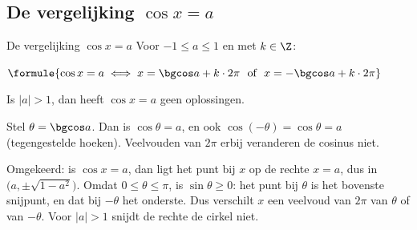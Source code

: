 \subsection{De vergelijking $\cos x = a$}


\begin{theorie}
\begin{stelling}{De vergelijking $\cos x = a$}
Voor $-1 \leqslant a \leqslant 1$ en met $k \in \Z$:

\vspace{1mm}
\qquad $\formule{\cos x = a \iff x = \bgcos a + k \cdot 2\pi \ \text{ of } \ x = -\bgcos a + k \cdot 2\pi}$

\vspace{1mm}
Is $|a| > 1$, dan heeft $\cos x = a$ geen oplossingen.
\end{stelling}
\begin{bewijs}
Stel $\theta = \bgcos a$. Dan is $\cos\theta = a$, en ook $\cos(-\theta) = \cos\theta = a$ (tegengestelde hoeken). Veelvouden van $2\pi$ erbij veranderen de cosinus niet.

Omgekeerd: is $\cos x = a$, dan ligt het punt bij $x$ op de rechte $x = a$, dus in $\bigl(a, \pm\sqrt{1 - a^2}\bigr)$. Omdat $0 \leqslant \theta \leqslant \pi$, is $\sin\theta \geqslant 0$: het punt bij $\theta$ is het bovenste snijpunt, en dat bij $-\theta$ het onderste. Dus verschilt $x$ een veelvoud van $2\pi$ van $\theta$ of van $-\theta$. Voor $|a| > 1$ snijdt de rechte de cirkel niet.
\end{bewijs}
\end{theorie}

